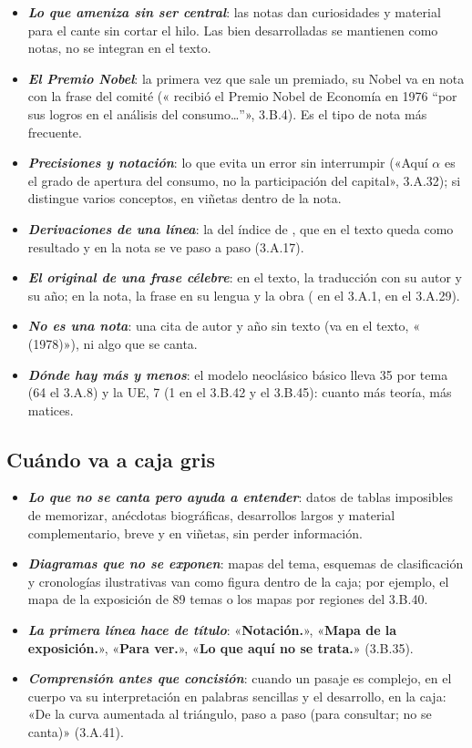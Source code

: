 \documentclass[11pt]{article}
\begin{document}
\begin{itemize}
\item \textbf{\emph{Lo que ameniza sin ser central}}: las notas dan curiosidades y material para el cante sin cortar el hilo. Las bien desarrolladas se mantienen como notas, no se integran en el texto.
\item \textbf{\emph{El Premio Nobel}}: la primera vez que sale un premiado, su Nobel va en nota con la frase del comité (« recibió el Premio Nobel de Economía en 1976 “por sus logros en el análisis del consumo…”», 3.B.4). Es el tipo de nota más frecuente.
\item \textbf{\emph{Precisiones y notación}}: lo que evita un error sin interrumpir («Aquí $\alpha$ es el grado de apertura del consumo, no la participación del capital», 3.A.32); si distingue varios conceptos, en viñetas dentro de la nota.
\item \textbf{\emph{Derivaciones de una línea}}: la del índice de , que en el texto queda como resultado y en la nota se ve paso a paso (3.A.17).
\item \textbf{\emph{El original de una frase célebre}}: en el texto, la traducción con su autor y su año; en la nota, la frase en su lengua y la obra ( en el 3.A.1,  en el 3.A.29).
\item \textbf{\emph{No es una nota}}: una cita de autor y año sin texto (va en el texto, « (1978)»), ni algo que se canta.
\item \textbf{\emph{Dónde hay más y menos}}: el modelo neoclásico básico lleva 35 por tema (64 el 3.A.8) y la UE, 7 (1 en el 3.B.42 y el 3.B.45): cuanto más teoría, más matices.
\end{itemize}

\subsection{Cuándo va a caja gris}\label{sec:caja}

\begin{itemize}
\item \textbf{\emph{Lo que no se canta pero ayuda a entender}}: datos de tablas imposibles de memorizar, anécdotas biográficas, desarrollos largos y material complementario, breve y en viñetas, sin perder información.
\item \textbf{\emph{Diagramas que no se exponen}}: mapas del tema, esquemas de clasificación y cronologías ilustrativas van como figura dentro de la caja; por ejemplo, el mapa de la exposición de 89 temas o los mapas por regiones del 3.B.40.
\item \textbf{\emph{La primera línea hace de título}}: «\textbf{Notación.}», «\textbf{Mapa de la exposición.}», «\textbf{Para ver.}», «\textbf{Lo que aquí no se trata.}» (3.B.35).
\item \textbf{\emph{Comprensión antes que concisión}}: cuando un pasaje es complejo, en el cuerpo va su interpretación en palabras sencillas y el desarrollo, en la caja: «De la curva aumentada al triángulo, paso a paso (para consultar; no se canta)» (3.A.41).
\end{itemize}
\end{document}
